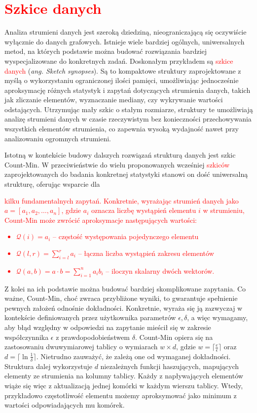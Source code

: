 \section{\textcolor{red}{Szkice danych}}
    Analiza strumieni danych jest szeroką dziedziną, nieograniczającą się oczywiście wyłącznie do danych grafowych. Istnieje wiele bardziej ogólnych, uniwersalnych metod, na których podstawie można budować rozwiązania bardziej wyspecjalizowane do konkretnych zadań. Doskonałym przykładem są \textcolor{red}{szkice danych} (\emph{ang. Sketch synopses}). Są to kompaktowe struktury zaprojektowane z myślą o wykorzystaniu ograniczonej ilości pamięci, umożliwiając jednocześnie aproksymację różnych statystyk i zapytań dotyczących strumienia danych, takich jak zliczanie elementów, wyznaczanie mediany, czy wykrywanie wartości odstających. Utrzymując mały szkic o stałym rozmiarze, struktury te umożliwiają analizę strumieni danych w czasie rzeczywistym bez konieczności przechowywania wszystkich elementów strumienia, co zapewnia wysoką wydajność nawet przy analizowaniu ogromnych strumieni.
    
    Istotną w kontekście budowy dalszych rozwiązań strukturą danych jest szkic Count-Min\cite{Cormode_Muthukrishnan_2005}. W przeciwieństwie do wielu proponowanych wcześniej \textcolor{red}{szkiców} zaprojektowanych do badania konkretnej statystyki stanowi on dość uniwersalną strukturę, oferując wsparcie dla \textcolor{red}{kilku fundamentalnych zapytań. Konkretnie, wyrażając strumień danych jako $a = [a_1, a_2, \dots, a_n]$, gdzie $a_i$ oznacza liczbę wystąpień elementu $i$ w strumieniu, Count-Min może zwrócić aproksymacje następujących wartości:
    \begin{itemize}
        \item $\mathcal{Q}(i) = a_i$ -- częstość występowania pojedynczego elementu 
        \item $\mathcal{Q}(l,r) = \sum\limits_{i = l}^{r} a_i$ -- łączna liczba wystąpień zakresu elementów 
        \item $\mathcal{Q}(a,b) = a \cdot b = \sum \limits_{i = 1}^{n} a_i b_i$ -- iloczyn skalarny dwóch wektorów.
    \end{itemize}}
     Z kolei na ich podstawie można budować bardziej skomplikowane zapytania. Co ważne, Count-Min, choć zwraca przybliżone wyniki, to gwarantuje spełnienie pewnych założeń odnośnie dokładności. Konkretnie, wyraża się ją zazwyczaj w kontekście definiowanych przez użytkownika parametrów $\epsilon, \delta$, a więc wymagamy, aby błąd względny w odpowiedzi na zapytanie mieścił się w zakresie współczynnika $\epsilon$ z prawdopodobieństwem $\delta$. Count-Min opiera się na zastosowaniu dwuwymiarowej tablicy o wymiarach $w \times d$, gdzie $w = \lceil \frac{e}{\epsilon} \rceil$ oraz $d = \lceil \ln \frac{1}{\delta} \rceil$. Nietrudno zauważyć, że zależą one od wymaganej dokładności. Struktura dalej wykorzystuje $d$ niezależnych funkcji haszujących, mapujących elementy ze strumienia na kolumny tablicy. Każdy z napływających elementów wiąże się więc z aktualizacją jednej komórki w każdym wierszu tablicy. Wtedy, przykładowo częstotliwość elementu możemy aproksymować jako minimum z wartości odpowiadających mu komórek. 

